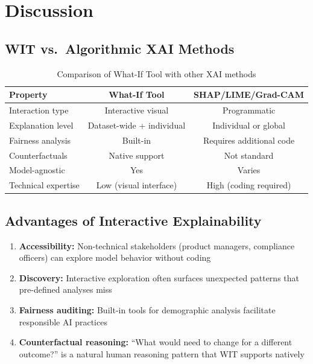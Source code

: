 \documentclass[12pt,a4paper]{article}
\begin{document}
\section{Discussion}

\subsection{WIT vs.\ Algorithmic XAI Methods}
\begin{table}[H]
    \centering
    \caption{Comparison of What-If Tool with other XAI methods}
    \begin{tabular}{lcc}
        \toprule
        \textbf{Property} & \textbf{What-If Tool} & \textbf{SHAP/LIME/Grad-CAM} \\
        \midrule
        Interaction type & Interactive visual & Programmatic \\
        Explanation level & Dataset-wide + individual & Individual or global \\
        Fairness analysis & Built-in & Requires additional code \\
        Counterfactuals & Native support & Not standard \\
        Model-agnostic & Yes & Varies \\
        Technical expertise & Low (visual interface) & High (coding required) \\
        \bottomrule
    \end{tabular}
    \label{tab:wit_comparison}
\end{table}

\subsection{Advantages of Interactive Explainability}
\begin{enumerate}
    \item \textbf{Accessibility:} Non-technical stakeholders (product managers, compliance officers) can explore model behavior without coding
    \item \textbf{Discovery:} Interactive exploration often surfaces unexpected patterns that pre-defined analyses miss
    \item \textbf{Fairness auditing:} Built-in tools for demographic analysis facilitate responsible AI practices
    \item \textbf{Counterfactual reasoning:} ``What would need to change for a different outcome?'' is a natural human reasoning pattern that WIT supports natively
\end{enumerate}
\end{document}
